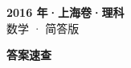 \documentclass[zihao=-4, a4paper]{ctexart}
\begin{document}
\begin{center}
  {\Large\bfseries 2016 年·上海卷·理科}\\[4pt]
  {\large 数学 · 简答版}
\end{center}
\medskip
{}

\clearpage
{}
\begin{center}{\Large\bfseries 答案速查}\end{center}
\medskip

\end{document}
